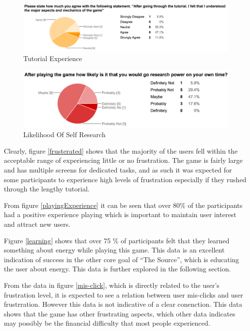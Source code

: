 \documentclass[msc,oneside]{ubcthesis}%
\begin{document}
\begin{figure}[hbt]
  \begin{center}
    \includegraphics[width=1\textwidth]{survey_pics/numeric/tutorial}
    \caption[Tutorial Experience]{Tutorial Experience}\label{tutorial}
  \end{center}
\end{figure}

\begin{figure}[hbt]
  \begin{center}
    \includegraphics[width=1\textwidth]{survey_pics/numeric/future_learning}
    \caption[self Learning ]{Likelihood Of Self Research}\label{future_learning}
  \end{center}
\end{figure}


Clearly, figure \ref{frusterated} shows that the majority of the users fell within the acceptable range of experiencing little or no frustration. The game is fairly large and has multiple screens for dedicated tasks, and as such it was expected for some participants to experience high levels of frustration especially if they rushed through the lengthy tutorial.

From figure \ref{playingExperience} it can be seen that over 80\% of the participants had a positive experience playing which is important to maintain user interest and attract new users.

Figure \ref{learning} shows that over 75 \% of participants felt that they learned something about energy while playing this game. This data is an excellent indication of success in the other core goal of ``The Source'', which is educating the user about energy. This data is further explored in the following section.

From the data in figure \ref{mis-click}, which is directly related to the user's frustration level, it is expected to see a relation between user mis-clicks and user frustrration. However this data is not indicative of a clear conenction. This data shows that the game has other frustrating aspects, which other data indicates may possibly be the financial difficulty that most people experienced.
\end{document}
